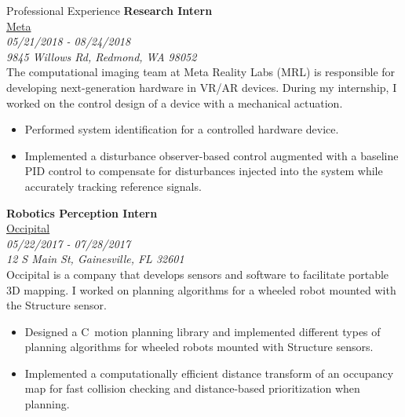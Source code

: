 \documentclass[9pt]{article}
\newcommand \CPP {{C\nolinebreak[4]\hspace{-.05em}\raisebox{.4ex}{\tiny\bf ++}}}
\begin{document}
\begin{rsection}{Professional Experience}
    \textbf{Research Intern} \\
    \href{https://about.facebook.com/realitylabs/}{Meta} \\
    \textit{05/21/2018 - 08/24/2018} \\
    \textit{9845 Willows Rd, Redmond, WA 98052}
    \vspace{0.5em} \\
    The computational imaging team at Meta Reality Labs (MRL) is responsible for developing next-generation hardware in VR/AR devices. During my internship, I worked on the control design of a device with a mechanical actuation.
    \begin{itemize}
        \item Performed system identification for a controlled hardware device.
        \item Implemented a disturbance observer-based control augmented with a baseline PID control to compensate for disturbances injected into the system while accurately tracking reference signals.
    \end{itemize}
    
    \textbf{Robotics Perception Intern} \\
    \href{https://occipital.com/}{Occipital} \\
    \textit{05/22/2017 - 07/28/2017} \\
    \textit{12 S Main St, Gainesville, FL 32601}
    \vspace{0.5em} \\
    Occipital is a company that develops sensors and software to facilitate portable 3D mapping. I worked on planning algorithms for a wheeled robot mounted with the Structure sensor.
    \begin{itemize}
        \item Designed a \CPP \ motion planning library and implemented different types of planning algorithms for wheeled robots mounted with Structure sensors.
        \item Implemented a computationally efficient distance transform of an occupancy map for fast collision checking and distance-based prioritization when planning.
    \end{itemize}
    

\end{rsection}
\end{document}
